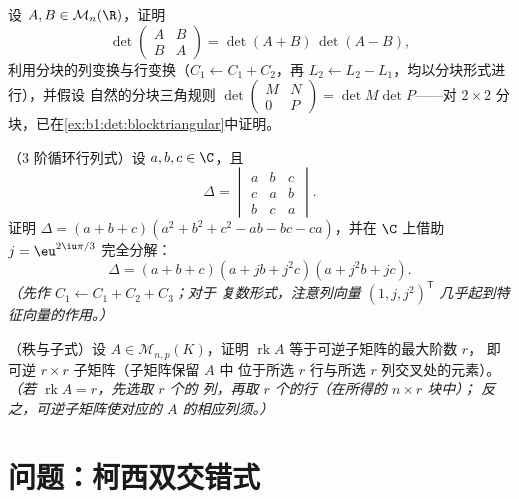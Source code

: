\begin{exercise}[$\star\star\star$]\label{exo:b1:det:10}
设 $A, B \in \mathcal{M}_n(\R)$，证明
\[
\det\begin{pmatrix} A & B\\ B & A \end{pmatrix}
= \det(A + B)\,\det(A - B),
\]
利用分块的列变换与行变换（$C_1 \leftarrow C_1 + C_2$，再
$L_2 \leftarrow L_2 - L_1$，均以分块形式进行），并假设
自然的分块三角规则 $\det\begin{pmatrix} M & N\\ 0 &
P\end{pmatrix} = \det M \det P$——对 $2 \times 2$
分块，已在\cref{ex:b1:det:blocktriangular}中证明。
\end{exercise}

\begin{exercise}[$\star\star$]\label{exo:b1:det:11}
（$3$ 阶循环行列式）设 $a, b, c \in \C$，且
\[
\Delta = \begin{vmatrix}
a & b & c\\
c & a & b\\
b & c & a
\end{vmatrix}.
\]
证明 $\Delta = (a + b + c)(a^2 + b^2 + c^2 - ab - bc -
ca)$，并在 $\C$ 上借助 $j =
\eu^{2\iu\pi/3}$ 完全分解：
\[
\Delta = (a + b + c)(a + jb + j^2c)(a + j^2b + jc) .
\]
\emph{（先作 $C_1 \leftarrow C_1 + C_2 + C_3$；对于
复数形式，注意列向量 $(1, j, j^2)^{\mathsf T}$
几乎起到特征向量的作用。）}
\end{exercise}

\begin{exercise}[$\star\star\star$]\label{exo:b1:det:12}
（秩与子式）设 $A \in \mathcal{M}_{n,p}(K)$，证明
$\operatorname{rk} A$ 等于可逆子矩阵的最大阶数 $r$，
即可逆 $r \times r$ 子矩阵（子矩阵保留 $A$ 中
位于所选 $r$ 行与所选 $r$
列交叉处的元素）。\emph{（若 $\operatorname{rk} A = r$，先选取 $r$ 个的
列，再取 $r$ 个的行（在所得的 $n \times r$ 块中）；
反之，可逆子矩阵使对应的
$A$ 的相应列须。）}
\end{exercise}

\section{问题：柯西双交错式}

